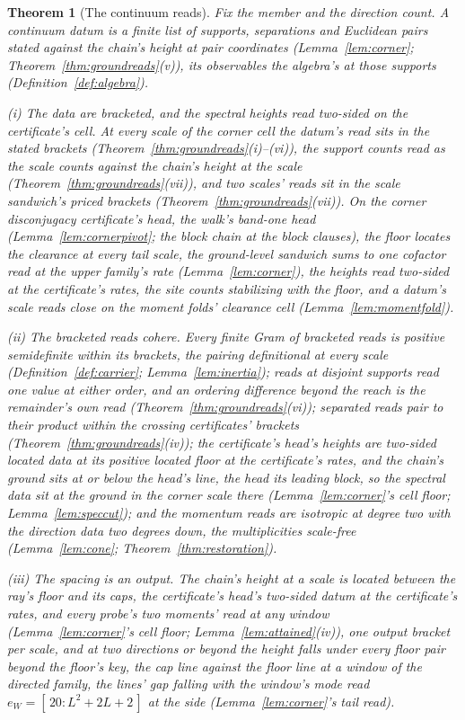 \documentclass[11pt]{article}
\newtheorem{theorem}{Theorem}
\theoremstyle{definition}
\begin{document}
\begin{theorem}[The continuum reads]\label{thm:continuum}
Fix the member and the direction count. A \emph{continuum
datum} is a finite list of supports, separations and Euclidean
pairs stated against the chain's height at pair coordinates
(Lemma~\ref{lem:corner}; Theorem~\ref{thm:groundreads}(v)), its
observables the algebra's at those supports
(Definition~\ref{def:algebra}).

\emph{(i) The data are bracketed, and the spectral heights
read two-sided on the certificate's cell.} At
every scale of the corner cell the datum's read sits in the stated
brackets (Theorem~\ref{thm:groundreads}(i)--(vi)), the support
counts read as the scale counts against the chain's height at the
scale (Theorem~\ref{thm:groundreads}(vii)), and two scales' reads
sit in the scale sandwich's priced brackets
(Theorem~\ref{thm:groundreads}(vii)). On the corner disconjugacy
certificate's head, the walk's band-one head
(Lemma~\ref{lem:cornerpivot}; the block chain at the block
clauses), the floor
locates the clearance at every tail scale, the ground-level
sandwich sums to one cofactor read at the upper family's rate
(Lemma~\ref{lem:corner}), the heights read two-sided at the
certificate's rates, the site counts stabilizing with the floor,
and a datum's scale reads close on the moment folds' clearance
cell (Lemma~\ref{lem:momentfold}).

\emph{(ii) The bracketed reads cohere.} Every finite Gram of
bracketed reads is positive semidefinite within its brackets, the pairing
definitional at every scale (Definition~\ref{def:carrier};
Lemma~\ref{lem:inertia}); reads at disjoint supports read one
value at either order, and an ordering difference beyond the reach
is the remainder's own read
(Theorem~\ref{thm:groundreads}(vi)); separated reads pair to their
product within the crossing certificates' brackets
(Theorem~\ref{thm:groundreads}(iv)); the certificate's head's
heights are two-sided located data at its positive located floor
at the certificate's rates, and the chain's ground sits at or below
the head's line, the head its leading block, so the spectral data
sit at the ground in the corner scale there
(Lemma~\ref{lem:corner}'s cell floor; Lemma~\ref{lem:speccut});
and the momentum reads are isotropic at
degree two with the direction data two degrees down, the
multiplicities scale-free (Lemma~\ref{lem:cone};
Theorem~\ref{thm:restoration}).

\emph{(iii) The spacing is an output.} The chain's height at a
scale is located between the ray's floor and its caps, the
certificate's head's two-sided datum at the certificate's rates,
and every probe's two moments' read at any window
(Lemma~\ref{lem:corner}'s cell floor; Lemma~\ref{lem:attained}(iv)),
one output bracket per scale, and at two directions or beyond the
height falls under every floor pair beyond the floor's key, the
cap line against the floor line at a window of the directed family,
the lines' gap falling with the window's mode read
$e_W=[\,20:L^{2}+2L+2\,]$ at the side (Lemma~\ref{lem:corner}'s
tail read).
\end{theorem}
\end{document}
